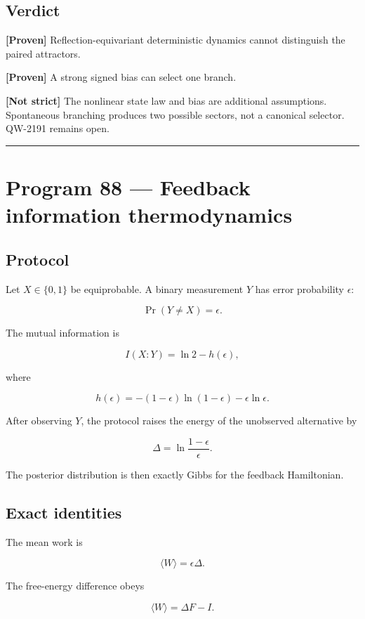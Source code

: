 \documentclass[11pt,a4paper,openany]{report}
\newcommand{\statusProven}{\textcolor{fingreen}{[Proven]}}
\begin{document}
\section{Verdict}

\textbf{\statusProven{}} Reflection-equivariant deterministic dynamics cannot distinguish the paired attractors.

\textbf{\statusProven{}} A strong signed bias can select one branch.

\textbf{[Not strict]} The nonlinear state law and bias are additional assumptions. Spontaneous branching produces two possible sectors, not a canonical selector. QW-2191 remains open.

\par\medskip\hrule\medskip

\chapter{Program 88 --- Feedback information thermodynamics}

\section{Protocol}

Let \(X\in\{0,1\}\) be equiprobable. A binary measurement \(Y\) has error probability \(\epsilon\):

\[
\Pr(Y\ne X)=\epsilon.
\]

The mutual information is

\[
I(X:Y)
=
\ln2-h(\epsilon),
\]

where

\[
h(\epsilon)
=
-(1-\epsilon)\ln(1-\epsilon)
-\epsilon\ln\epsilon.
\]

After observing \(Y\), the protocol raises the energy of the unobserved alternative by

\[
\Delta
=
\ln\frac{1-\epsilon}{\epsilon}.
\]

The posterior distribution is then exactly Gibbs for the feedback Hamiltonian.

\section{Exact identities}

The mean work is

\[
\langle W\rangle=\epsilon\Delta.
\]

The free-energy difference obeys

\[
\langle W\rangle
=
\Delta F-I.
\]
\end{document}
